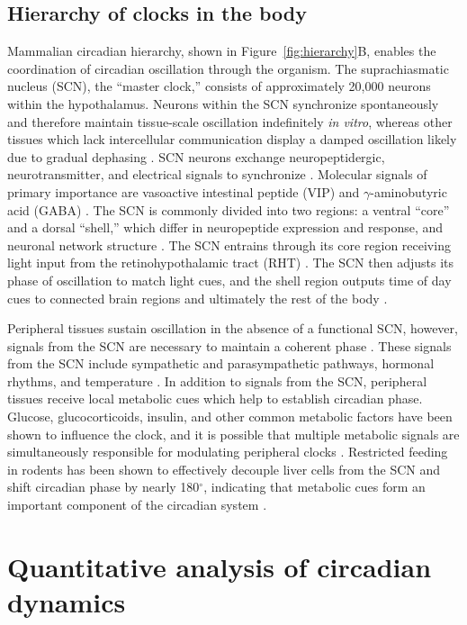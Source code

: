 \subsection*{Hierarchy of clocks in the body}
Mammalian circadian hierarchy, shown in Figure~\ref{fig:hierarchy}B, enables the coordination of circadian oscillation through the organism.
The suprachiasmatic nucleus (SCN), the ``master clock,'' consists of approximately 20,000 neurons within the hypothalamus.
Neurons within the SCN synchronize spontaneously and therefore maintain tissue-scale oscillation indefinitely \textit{in vitro}, whereas other tissues which lack intercellular communication display a damped oscillation likely due to gradual dephasing \cite{Welsh2004, Yoo2004}. 
SCN neurons exchange neuropeptidergic, neurotransmitter, and electrical signals to synchronize \cite{Welsh2010}.
Molecular signals of primary importance are vasoactive intestinal peptide (VIP) and $\gamma$-aminobutyric acid (GABA) \cite{Aton2005, Aton2006, Evans2013, Myung2015}.
The SCN is commonly divided into two regions: a ventral ``core'' and a dorsal ``shell,'' which differ in neuropeptide expression and response, and neuronal network structure \cite{Albus2005, Welsh2010, Myung2015, DeWoskin2015, Evans2013, Abel2016}.
The SCN entrains through its core region receiving light input from the retinohypothalamic tract (RHT) \cite{Welsh2010}.
The SCN then adjusts its phase of oscillation to match light cues, and the shell region outputs time of day cues to connected brain regions and ultimately the rest of the body \cite{Evans2015}.

Peripheral tissues sustain oscillation in the absence of a functional SCN, however, signals from the SCN are necessary to maintain a coherent phase \cite{Welsh2010}.
These signals from the SCN include sympathetic and parasympathetic pathways, hormonal rhythms, and temperature \cite{Mohawk2012}.
In addition to signals from the SCN, peripheral tissues receive local metabolic cues which help to establish circadian phase.
Glucose, glucocorticoids, insulin, and other common metabolic factors have been shown to influence the clock, and it is possible that multiple metabolic signals are simultaneously responsible for modulating peripheral clocks \cite{Green2008, Bass2010}.
Restricted feeding in rodents has been shown to effectively decouple liver cells from the SCN and shift circadian phase by nearly 180$^\circ$, indicating that metabolic cues form an important component of the circadian system \cite{Damiola2000}.

\section{Quantitative analysis of circadian dynamics}

